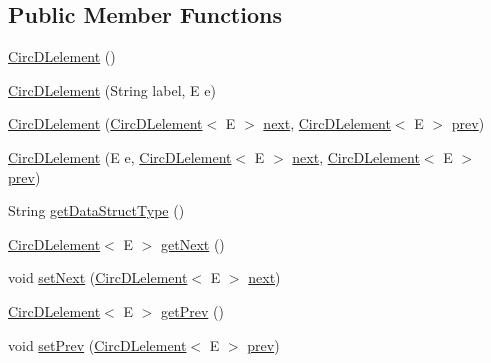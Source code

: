 \subsection*{Public Member Functions}
\begin{DoxyCompactItemize}
\item 
\hyperlink{classbridges_1_1base_1_1_circ_d_lelement_ad14ccb772d52c36802c118f2b3f15d59}{Circ\+D\+Lelement} ()
\item 
\hyperlink{classbridges_1_1base_1_1_circ_d_lelement_a84b2ebf47d2ca24077a800b240d8d157}{Circ\+D\+Lelement} (String label, E e)
\item 
\hyperlink{classbridges_1_1base_1_1_circ_d_lelement_a98a471fc3225ed80595e1ffdb377e336}{Circ\+D\+Lelement} (\hyperlink{classbridges_1_1base_1_1_circ_d_lelement}{Circ\+D\+Lelement}$<$ E $>$ \hyperlink{classbridges_1_1base_1_1_s_lelement_abf61c96a74ad319d561c6952ea388e0e}{next}, \hyperlink{classbridges_1_1base_1_1_circ_d_lelement}{Circ\+D\+Lelement}$<$ E $>$ \hyperlink{classbridges_1_1base_1_1_d_lelement_a6eba4876f820b75ac6bde01d7dea9da7}{prev})
\item 
\hyperlink{classbridges_1_1base_1_1_circ_d_lelement_a86e04c826251be9a1a92c4649844e5e7}{Circ\+D\+Lelement} (E e, \hyperlink{classbridges_1_1base_1_1_circ_d_lelement}{Circ\+D\+Lelement}$<$ E $>$ \hyperlink{classbridges_1_1base_1_1_s_lelement_abf61c96a74ad319d561c6952ea388e0e}{next}, \hyperlink{classbridges_1_1base_1_1_circ_d_lelement}{Circ\+D\+Lelement}$<$ E $>$ \hyperlink{classbridges_1_1base_1_1_d_lelement_a6eba4876f820b75ac6bde01d7dea9da7}{prev})
\item 
String \hyperlink{classbridges_1_1base_1_1_circ_d_lelement_ab4885ae7517f1dd04874270c1c3eaf44}{get\+Data\+Struct\+Type} ()
\item 
\hyperlink{classbridges_1_1base_1_1_circ_d_lelement}{Circ\+D\+Lelement}$<$ E $>$ \hyperlink{classbridges_1_1base_1_1_circ_d_lelement_a9ace56dde1f4c23e9a8798c045100ee6}{get\+Next} ()
\item 
void \hyperlink{classbridges_1_1base_1_1_circ_d_lelement_ae3a0c83ecc08289199344cd440f2ebe4}{set\+Next} (\hyperlink{classbridges_1_1base_1_1_circ_d_lelement}{Circ\+D\+Lelement}$<$ E $>$ \hyperlink{classbridges_1_1base_1_1_s_lelement_abf61c96a74ad319d561c6952ea388e0e}{next})
\item 
\hyperlink{classbridges_1_1base_1_1_circ_d_lelement}{Circ\+D\+Lelement}$<$ E $>$ \hyperlink{classbridges_1_1base_1_1_circ_d_lelement_aa2b83017a571694460f77dd31b4188ed}{get\+Prev} ()
\item 
void \hyperlink{classbridges_1_1base_1_1_circ_d_lelement_ade2cf166a572c051cd284f4e5ba67780}{set\+Prev} (\hyperlink{classbridges_1_1base_1_1_circ_d_lelement}{Circ\+D\+Lelement}$<$ E $>$ \hyperlink{classbridges_1_1base_1_1_d_lelement_a6eba4876f820b75ac6bde01d7dea9da7}{prev})
\end{DoxyCompactItemize}

